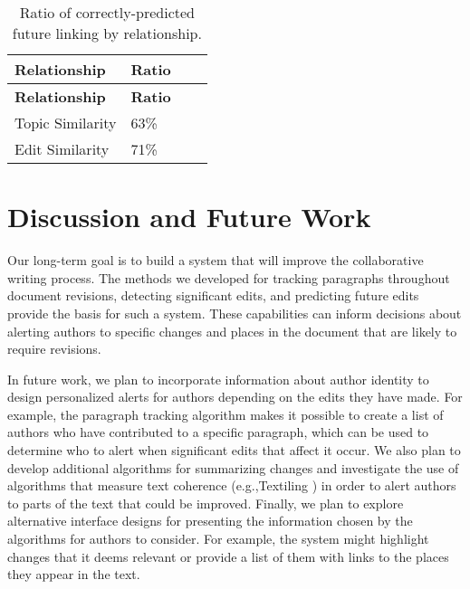 \begin{longtable}[c]{@{}llll@{}}
\caption{Ratio of correctly-predicted future linking by
relationship.{}}\tabularnewline
\toprule
\textbf{Relationship} & \textbf{Ratio} & &\tabularnewline
\midrule
\endfirsthead
\toprule
\textbf{Relationship} & \textbf{Ratio} & &\tabularnewline
\midrule
\endhead
Topic Similarity & 63\% & &\tabularnewline
Edit Similarity & 71\% & &\tabularnewline
\bottomrule
\end{longtable}

\section{Discussion and Future Work}\label{discussion-and-future-work}

Our long-term goal is to build a system that will improve the
collaborative writing process. The methods we developed for tracking
paragraphs throughout document revisions, detecting significant edits,
and predicting future edits provide the basis for such a system. These
capabilities can inform decisions about alerting authors to specific
changes and places in the document that are likely to require revisions.

In future work, we plan to incorporate information about author identity
to design personalized alerts for authors depending on the edits they
have made. For example, the paragraph tracking algorithm makes it
possible to create a list of authors who have contributed to a specific
paragraph, which can be used to determine who to alert when significant
edits that affect it occur. We also plan to develop additional
algorithms for summarizing changes and investigate the use of algorithms
that measure text coherence (e.g.,Textiling \cite{hearst1994multi}) in
order to alert authors to parts of the text that could be improved.
Finally, we plan to explore alternative interface designs for presenting
the information chosen by the algorithms for authors to consider. For
example, the system might highlight changes that it deems relevant or
provide a list of them with links to the places they appear in the text.
